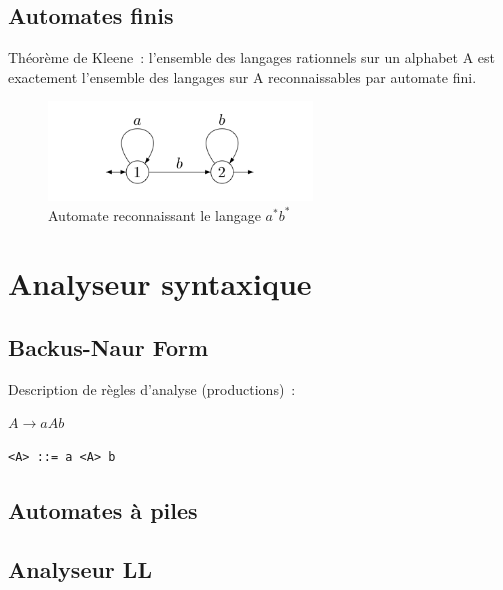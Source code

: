 \documentclass{beamer}
\begin{document}
\subsection{Automates finis}

\begin{frame}
	Théorème de Kleene~: l'ensemble des langages rationnels sur un alphabet A est exactement l'ensemble des langages sur A reconnaissables par automate fini.
	\begin{figure}[!c]
	 \includegraphics[width=7cm]{Images/Automate-synchronise.png}
	 \caption{Automate reconnaissant le langage $a^*b^*$}
	\end{figure}

\end{frame}

\section{Analyseur syntaxique}

\subsection{Backus-Naur Form}

\begin{frame}[fragile]
 Description de règles d'analyse (productions)~:

 \begin{center}
	$A \rightarrow aAb$ \\
	\begin{BVerbatim}
<A> ::= a <A> b
	\end{BVerbatim}
 \end{center}
\end{frame}

\subsection{Automates à piles}

\begin{frame}
 
\end{frame}

\subsection{Analyseur LL}
\end{document}
